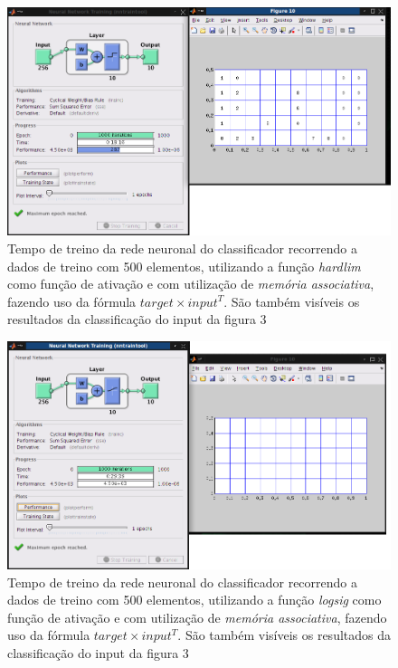 \documentclass{article}
\begin{document}
\begin{figure}[h]
  \centering
      \includegraphics[scale=0.3]{500_Transpose_Hardlim.png}
  \caption{Tempo de treino da rede neuronal do classificador recorrendo a dados de treino com 500 elementos, utilizando a função \emph{hardlim} como função de ativação e com utilização de \emph{memória associativa}, fazendo uso da fórmula $target\times input^T$. São também visíveis os resultados da classificação do input da figura 3}
\end{figure}

\begin{figure}[h]
  \centering
      \includegraphics[scale=0.3]{500_Transpose_Sigmoidal.png}
  \caption{Tempo de treino da rede neuronal do classificador recorrendo a dados de treino com 500 elementos, utilizando a função \emph{logsig} como função de ativação e com utilização de \emph{memória associativa}, fazendo uso da fórmula $target\times input^T$. São também visíveis os resultados da classificação do input da figura 3}
\end{figure}
\end{document}
